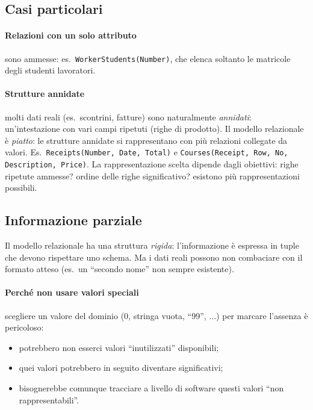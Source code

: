 \documentclass[a4paper,12pt]{article}
\begin{document}
\subsection{Casi particolari}

\paragraph{Relazioni con un solo attributo} sono ammesse: es.\
\texttt{WorkerStudents(Number)}, che elenca soltanto le matricole degli
studenti lavoratori.

\paragraph{Strutture annidate} molti dati reali (es.\ scontrini, fatture) sono
naturalmente \emph{annidati}: un'intestazione con vari campi ripetuti (righe di
prodotto). Il modello relazionale è \emph{piatto}: le strutture annidate si
rappresentano con più relazioni collegate da valori. Es.\
\texttt{Receipts(Number, Date, Total)} e
\texttt{Courses(Receipt, Row, No, Description, Price)}. La rappresentazione
scelta dipende dagli obiettivi: righe ripetute ammesse? ordine delle righe
significativo? esistono più rappresentazioni possibili.

\subsection{Informazione parziale}

Il modello relazionale ha una struttura \emph{rigida}: l'informazione è
espressa in tuple che devono rispettare uno schema. Ma i dati reali possono non
combaciare con il formato atteso (es.\ un ``secondo nome'' non sempre
esistente).

\paragraph{Perché non usare valori speciali} scegliere un valore del dominio (0,
stringa vuota, ``99'', $\ldots$) per marcare l'assenza è pericoloso:
\begin{itemize}
  \item potrebbero non esserci valori ``inutilizzati'' disponibili;
  \item quei valori potrebbero in seguito diventare significativi;
  \item bisognerebbe comunque tracciare a livello di software questi valori
    ``non rappresentabili''.
\end{itemize}
\end{document}
